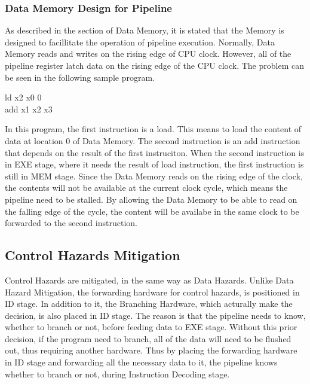 \subsubsection{Data Memory Design for Pipeline}
As described in the section of Data Memory, it is stated that the Memory is designed to facillitate the operation of pipeline execution.
Normally, Data Memory reads and writes on the rising edge of CPU clock.
However, all of the pipeline register latch data on the rising edge of the CPU clock. The problem can be seen in the following sample program.

\begin{center}
    ld x2 x0 0 \\
    add x1 x2 x3
\end{center}

In this program, the first instruction is a load. This means to load the content of data at location 0 of Data Memory.
The second instruction is an add instruction that depends on the result of the first instruciton.
When the second instruction is in EXE stage, where it needs the result of load instruction, the first instruction is still in MEM stage.
Since the Data Memory reads on the rising edge of the clock, the contents will not be available at the current clock cycle, which means the pipeline need to be stalled.
By allowing the Data Memory to be able to read on the falling edge of the cycle, the content will be availabe in the same clock to be forwarded to the second instruction.

\subsection{Control Hazards Mitigation}
Control Hazards are mitigated, in the same way as Data Hazards.
Unlike Data Hazard Mitigation, the forwarding hardware for control hazards, is positioned in ID stage.
In addition to it, the Branching Hardware, which acturally make the decision, is also placed in ID stage.
The reason is that the pipeline needs to know, whether to branch or not, before feeding data to EXE stage.
Without this prior decision, if the program need to branch, all of the data will need to be flushed out, thus requiring another hardware.
Thus by placing the forwarding hardware in ID stage and forwarding all the necessary data to it, the pipeline knows whether to branch or not, during Instruction Decoding stage.

